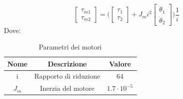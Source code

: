 \begin{equation}
	\begin{bmatrix}
		\tau_{m1}  \\ \tau_{m2} 
	\end{bmatrix} = \bigg(
	\begin{bmatrix}
	\tau_{1}  \\ \tau_{2} 
\end{bmatrix} + J_mi^2 	\begin{bmatrix}
\ddot{\theta}_{1}  \\ \ddot{\theta}_{2} 
\end{bmatrix}\bigg) \frac{1}{i}
\end{equation}
Dove:
\begin{table}[h!]
	\centering
	\begin{tabular}{|c|c| c|} 
		\hline
		Nome &  Descrizione & Valore  \\
		\hline\hline
		i & Rapporto di riduzione & 64 \\
		$J_m$ & Inerzia del motore &$1.7\cdot 10^{-5}$ \\
		\hline
	\end{tabular}
	\caption{Parametri dei motori}
	\label{table:parametriMotore}
\end{table}
